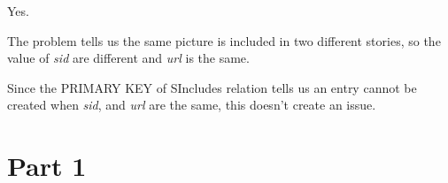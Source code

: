 \documentclass[12pt]{article}
\begin{document}
\begin{enumerate}[1.]
    \bigskip

    \begin{mdframed}

    Yes.

    \bigskip

    The problem tells us the same picture is included in two different stories,
    so the value of \textit{sid} are different and \textit{url} is the same.

    \bigskip

    Since the PRIMARY KEY of SIncludes relation tells us an entry cannot be created when
    \textit{sid}, and \textit{url} are the same, this doesn't create an issue.

    \end{mdframed}

\end{enumerate}

\section*{Part 1}
\end{document}
